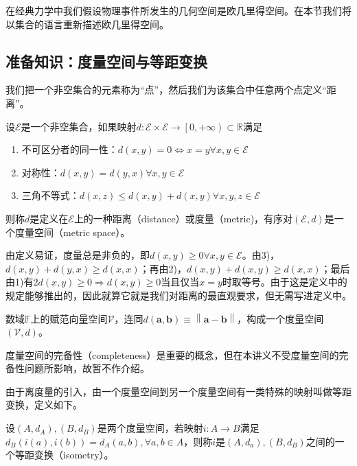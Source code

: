 \documentclass[main.tex]{subfiles}
\begin{document}
在经典力学中我们假设物理事件所发生的几何空间是欧几里得空间。在本节我们将以集合的语言重新描述欧几里得空间。

\subsection{准备知识：度量空间与等距变换}

我们把一个非空集合的元素称为“点”，然后我们为该集合中任意两个点定义“距离”。

\begin{definition}[度量空间]
设$\mathcal{E}$是一个非空集合，如果映射$d:\mathcal{E}\times\mathcal{E}\rightarrow\left[0,+\infty\right)\subset\mathbb{R}$满足
\begin{enumerate}
    \item 不可区分者的同一性：$d\left(x,y\right)=0\Leftrightarrow x=y\forall x,y\in\mathcal{E}$
    \item 对称性：$d\left(x,y\right)=d\left(y,x\right)\forall x,y\in\mathcal{E}$
    \item 三角不等式：$d\left(x,z\right)\leq d\left(x,y\right)+d\left(x,y\right)\forall x,y,z\in\mathcal{E}$
\end{enumerate}
则称$d$是定义在$\mathcal{E}$上的一种距离（distance）或度量（metric)，有序对$\left(\mathcal{E},d\right)$是一个度量空间（metric space）。
\end{definition}

由定义易证，度量总是非负的，即$d\left(x,y\right)\geq0\forall x,y\in\mathcal{E}$。由3)，$d\left(x,y\right)+d\left(y,x\right)\geq d\left(x,x\right)$；再由2)，$d\left(x,y\right)+d\left(x,y\right)\geq d\left(x,x\right)$；最后由1)有$2d\left(x,y\right)\geq0\Rightarrow d\left(x,y\right)\geq0$当且仅当$x=y$时取等号。由于这是定义中的规定能够推出的，因此就算它就是我们对距离的最直观要求，但无需写进定义中。

\begin{example}
数域$\mathbb{F}$上的赋范向量空间$\mathcal{V}$，连同$d\left(\mathbf{a},\mathbf{b}\right)\equiv\left\|\mathbf{a}-\mathbf{b}\right\|$，构成一个度量空间$\left(\mathcal{V},d\right)$。
\end{example}

度量空间的完备性（completeness）是重要的概念，但在本讲义不受度量空间的完备性问题所影响，故暂不作介绍。

由于离度量的引入，由一个度量空间到另一个度量空间有一类特殊的映射叫做等距变换，定义如下。

\begin{definition}[等距变换]
设$\left(A,d_A\right),\left(B,d_B\right)$是两个度量空间，若映射$i:A\rightarrow B$满足$d_B\left(i\left(a\right),i\left(b\right)\right)=d_A\left(a,b\right),\forall a,b\in A$，则称$i$是$\left(A,d_a\right),\left(B,d_B\right)$之间的一个等距变换（isometry）。
\end{definition}
\end{document}
